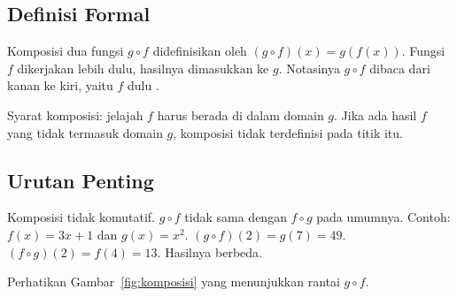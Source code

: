 \documentclass[11pt,a4paper]{article}
\begin{document}
\subsection{Definisi Formal}

Komposisi dua fungsi $g \circ f$ didefinisikan oleh $(g \circ f)(x)=g(f(x))$. Fungsi $f$ dikerjakan lebih dulu, hasilnya dimasukkan ke $g$. Notasinya $g \circ f$ dibaca dari kanan ke kiri, yaitu $f$ dulu \cite{rosen}.

Syarat komposisi: jelajah $f$ harus berada di dalam domain $g$. Jika ada hasil $f$ yang tidak termasuk domain $g$, komposisi tidak terdefinisi pada titik itu.

\subsection{Urutan Penting}

Komposisi tidak komutatif. $g \circ f$ tidak sama dengan $f \circ g$ pada umumnya. Contoh: $f(x)=3x+1$ dan $g(x)=x^2$. $(g \circ f)(2)=g(7)=49$. $(f \circ g)(2)=f(4)=13$. Hasilnya berbeda.

Perhatikan Gambar~\ref{fig:komposisi} yang menunjukkan rantai $g \circ f$.
\end{document}
